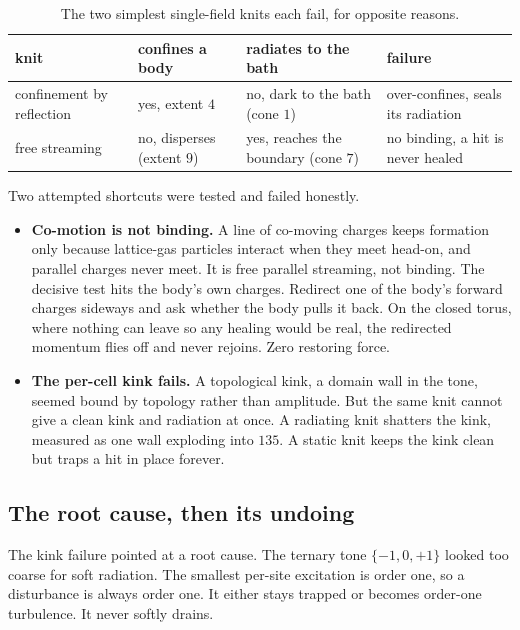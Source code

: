 \begin{table}[ht]
\centering
\begin{tabular}{@{}lllp{}@{}}
\toprule
knit & confines a body & radiates to the bath & failure \\
\midrule
confinement by reflection & yes, extent $4$ & no, dark to the bath (cone $1$) & over-confines, seals its
radiation \\
free streaming & no, disperses (extent $9$) & yes, reaches the boundary (cone $7$) & no binding, a hit is never
healed \\
\bottomrule
\end{tabular}
\caption{The two simplest single-field knits each fail, for opposite reasons.}
\label{tab:bind-radiate}
\end{table}

Two attempted shortcuts were tested and failed honestly.

\begin{itemize}
\item \textbf{Co-motion is not binding.} A line of co-moving charges keeps formation only because lattice-gas
particles interact when they meet head-on, and parallel charges never meet. It is free parallel streaming, not
binding. The decisive test hits the body's own charges. Redirect one of the body's forward charges sideways and
ask whether the body pulls it back. On the closed torus, where nothing can leave so any healing would be real,
the redirected momentum flies off and never rejoins. Zero restoring force.
\item \textbf{The per-cell kink fails.} A topological kink, a domain wall in the tone, seemed bound by topology
rather than amplitude. But the same knit cannot give a clean kink and radiation at once. A radiating knit
shatters the kink, measured as one wall exploding into $135$. A static knit keeps the kink clean but traps a hit
in place forever.
\end{itemize}

\subsection{The root cause, then its undoing}

The kink failure pointed at a root cause. The ternary tone $\{-1, 0, +1\}$ looked too coarse for soft radiation.
The smallest per-site excitation is order one, so a disturbance is always order one. It either stays trapped or
becomes order-one turbulence. It never softly drains.

